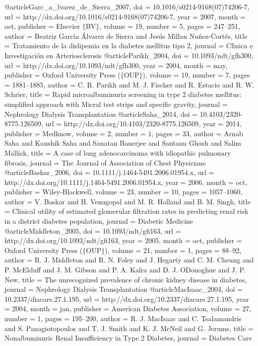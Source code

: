 @article{Garc_a_lvarez_de_Sierra_2007,
	doi = {10.1016/s0214-9168(07)74206-7},
	url = {http://dx.doi.org/10.1016/s0214-9168(07)74206-7},
	year = 2007,
	month = {oct},
	publisher = {Elsevier $\lbrace$BV$\rbrace$},
	volume = {19},
	number = {5},
	pages = {247--251},
	author = {Beatriz Garc{\'{\i}}a {\'{A}}lvarez de Sierra and Jes{\'{u}}s Millan Nu{\~{n}}ez-Cort{\'{e}}s},
	title = {Tratamiento de la dislipemia en la diabetes mellitus tipo 2},
	journal = {Cl{\'{\i}}nica e Investigaci{\'{o}}n en Arteriosclerosis}
}
@article{Parikh_2004,
	doi = {10.1093/ndt/gfh300},
	url = {http://dx.doi.org/10.1093/ndt/gfh300},
	year = 2004,
	month = {may},
	publisher = {Oxford University Press ($\lbrace$OUP$\rbrace$)},
	volume = {19},
	number = {7},
	pages = {1881--1885},
	author = {C. R. Parikh and M. J. Fischer and R. Estacio and R. W. Schrier},
	title = {Rapid microalbuminuria screening in type 2 diabetes mellitus: simplified approach with Micral test strips and specific gravity},
	journal = {Nephrology Dialysis Transplantation}
}
@article{Saha_2014,
	doi = {10.4103/2320-8775.126509},
	url = {http://dx.doi.org/10.4103/2320-8775.126509},
	year = 2014,
	publisher = {Medknow},
	volume = {2},
	number = {1},
	pages = {33},
	author = {Arnab Saha and Kaushik Saha and Sanatan Banerjee and Santanu Ghosh and Salim Mallick},
	title = {A case of lung adenocarcinoma with idiopathic pulmonary fibrosis},
	journal = {The Journal of Association of Chest Physicians}
}
@article{Baskar_2006,
	doi = {10.1111/j.1464-5491.2006.01954.x},
	url = {http://dx.doi.org/10.1111/j.1464-5491.2006.01954.x},
	year = 2006,
	month = {oct},
	publisher = {Wiley-Blackwell},
	volume = {23},
	number = {10},
	pages = {1057--1060},
	author = {V. Baskar and H. Venugopal and M. R. Holland and B. M. Singh},
	title = {Clinical utility of estimated glomerular filtration rates in predicting renal risk in a district diabetes population},
	journal = {Diabetic Medicine}
}
@article{Middleton_2005,
	doi = {10.1093/ndt/gfi163},
	url = {http://dx.doi.org/10.1093/ndt/gfi163},
	year = 2005,
	month = {oct},
	publisher = {Oxford University Press ($\lbrace$OUP$\rbrace$)},
	volume = {21},
	number = {1},
	pages = {88--92},
	author = {R. J. Middleton and R. N. Foley and J. Hegarty and C. M. Cheung and P. McElduff and J. M. Gibson and P. A. Kalra and D. J. O{\textquotesingle}Donoghue and J. P. New},
	title = {The unrecognized prevalence of chronic kidney disease in diabetes},
	journal = {Nephrology Dialysis Transplantation}
}
@article{MacIsaac_2004,
	doi = {10.2337/diacare.27.1.195},
	url = {http://dx.doi.org/10.2337/diacare.27.1.195},
	year = 2004,
	month = {jan},
	publisher = {American Diabetes Association},
	volume = {27},
	number = {1},
	pages = {195--200},
	author = {R. J. MacIsaac and C. Tsalamandris and S. Panagiotopoulos and T. J. Smith and K. J. McNeil and G. Jerums},
	title = {Nonalbuminuric Renal Insufficiency in Type 2 Diabetes},
	journal = {Diabetes Care}
}
